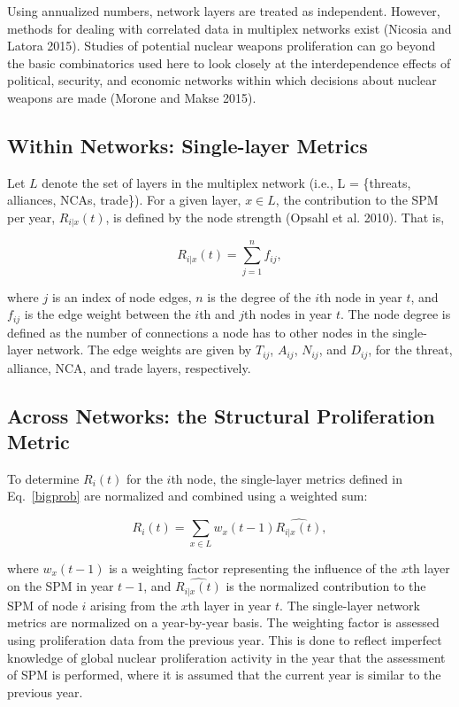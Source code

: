 \documentclass{article} %
\begin{document}
{Using annualized numbers, network layers are treated as independent. However, methods for dealing with correlated data in multiplex networks exist (Nicosia and Latora 2015). Studies of potential nuclear weapons proliferation can go beyond the basic combinatorics used here to look closely at the interdependence effects of political, security, and economic networks within which decisions about nuclear weapons are made (Morone and Makse 2015). 


\subsection{Within Networks: Single-layer Metrics}
\label{layerspec}

Let $L$ denote the set of layers in the multiplex network (i.e., L = \{threats, alliances, NCAs, trade\}). For a given layer, $x \in L$, the contribution to the SPM per year, $R_{i|x}(t)$, is defined by the node strength (Opsahl et al. 2010). That is, 
\begin{center}
\begin{equation}
\label{bigprob}
R_{i|x}(t) = \sum_{j=1}^{n} f_{ij}, 
\end{equation}
\end{center}
where $j$ is an index of node edges, $n$ is the degree of the $i$th node in year $t$, and $f_{ij}$ is the edge weight between the $i$th and $j$th nodes in year $t$. The node degree is defined as the number of connections a node has to other nodes in the single-layer network. The edge weights are given by $T_{ij}$, $A_{ij}$, $N_{ij}$, and $D_{ij}$, for the threat, alliance, NCA, and trade layers, respectively. 

\subsection{Across Networks: the Structural Proliferation Metric}
\label{rep}

To determine $R_i(t)$ for the $i$th node, the single-layer metrics defined in Eq.~\ref{bigprob} are normalized and combined using a weighted sum:
\begin{center}
\begin{equation}
\label{rpp}
R_i(t) = {\sum_{x \in L} w_x(t-1) \widehat{R_{i|x}(t)}},
\end{equation}
\end{center}
where $w_x(t-1)$ is a weighting factor representing the influence of the $x$th layer on the SPM in year $t-1$, and $\widehat{R_{i|x}(t)}$ is the normalized contribution to the SPM of node $i$ arising from the $x$th layer in year $t$. The single-layer network metrics are normalized on a year-by-year basis. The weighting factor is assessed using proliferation data from the previous year. This is done to reflect imperfect knowledge of global nuclear proliferation activity in the year that the assessment of SPM is performed, where it is assumed that the current year is similar to the previous year. 

}
\end{document}
